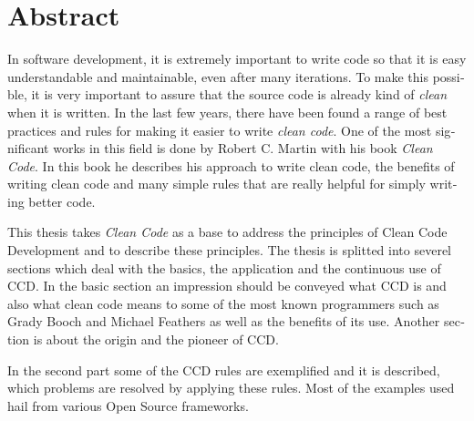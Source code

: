 \chapter{Abstract}

\begin{english} 
In software development, it is extremely important to write code so that it is easy understandable and maintainable, even after many iterations. To make this possible, it is very important to assure that the source code is already kind of \textit{clean} when it is written. In the last few years, there have been found a range of best practices and rules for making it easier to write \textit{clean code}. One of the most significant works in this field is done by Robert C. Martin with his book \textit{Clean Code}. In this book he describes his approach to write clean code, the benefits of writing clean code and many simple rules that are really helpful for simply writing better code.

This thesis takes \textit{Clean Code} as a base to address the principles of Clean Code Development and to describe these principles. The thesis is splitted into severel sections which deal with the basics, the application and the continuous use of CCD. In the basic section an impression should be conveyed what CCD is and also what clean code means to some of the most known programmers such as Grady Booch and Michael Feathers as well as the benefits of its use. Another section is about the origin and the pioneer of CCD. 

In the second part some of the CCD rules are exemplified and it is described, which problems are resolved by applying these rules. Most of the examples used hail from various Open Source frameworks.

\end{english}